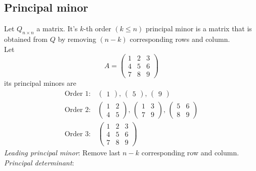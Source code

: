 \documentclass[../main-sheet.tex]{subfiles}
\begin{document}
\subsection{Principal minor} Let \(Q_{n\times n}\) a matrix. It's \(k\)-th order \((k\leq n)\) principal minor is a matrix that is obtained from \(Q\) by removing \((n-k)\) corresponding rows and column.\\
Let
\[A=\begin{pmatrix}
    1&2&3\\
    4&5&6\\
    7&8&9
\end{pmatrix}
\]
its principal minors are
\begin{align*}
    \text{Order }1:&\begin{pmatrix}
        1
    \end{pmatrix},\,\begin{pmatrix}
        5
    \end{pmatrix},\,\begin{pmatrix}
        9
    \end{pmatrix}\\
    \text{Order }2:&\begin{pmatrix}
        1 & 2\\
        4&5
    \end{pmatrix},\,\begin{pmatrix}
        1& 3\\
        7&9
    \end{pmatrix},\,\begin{pmatrix}
        5&6\\
        8&9
    \end{pmatrix}\\
    \text{Order }3:&\begin{pmatrix}
        1&2&3\\
    4&5&6\\
    7&8&9
    \end{pmatrix}
\end{align*}
\emph{Leading principal minor}: Remove last \(n-k\) corresponding row and column.\\
\emph{Principal determinant}:
\end{document}
